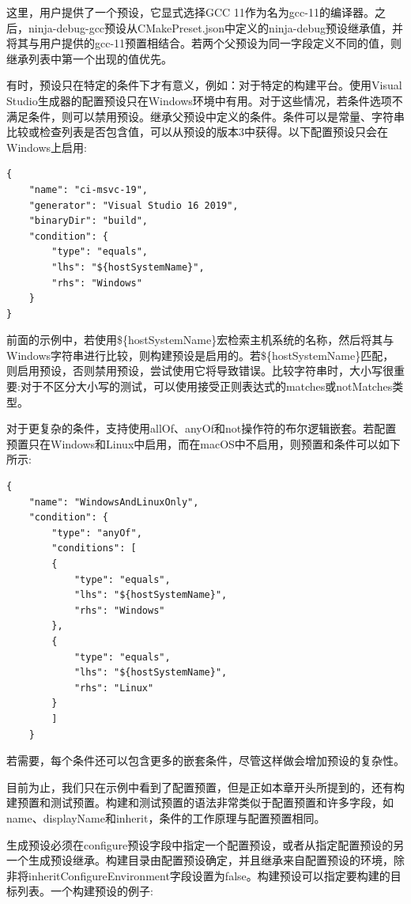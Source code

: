 这里，用户提供了一个预设，它显式选择GCC 11作为名为gcc-11的编译器。之后，ninja-debug-gcc预设从CMakePreset.json中定义的ninja-debug预设继承值，并将其与用户提供的gcc-11预置相结合。若两个父预设为同一字段定义不同的值，则继承列表中第一个出现的值优先。


有时，预设只在特定的条件下才有意义，例如：对于特定的构建平台。使用Visual Studio生成器的配置预设只在Windows环境中有用。对于这些情况，若条件选项不满足条件，则可以禁用预设。继承父预设中定义的条件。条件可以是常量、字符串比较或检查列表是否包含值，可以从预设的版本3中获得。以下配置预设只会在Windows上启用:

\begin{lstlisting}[style=styleCMake]
{
	"name": "ci-msvc-19",
	"generator": "Visual Studio 16 2019",
	"binaryDir": "build",
	"condition": {
		"type": "equals",
		"lhs": "${hostSystemName}",
		"rhs": "Windows"
	}
}
\end{lstlisting}

前面的示例中，若使用\$\{hostSystemName\}宏检索主机系统的名称，然后将其与Windows字符串进行比较，则构建预设是启用的。若\$\{hostSystemName\}匹配，则启用预设，否则禁用预设，尝试使用它将导致错误。比较字符串时，大小写很重要:对于不区分大小写的测试，可以使用接受正则表达式的matches或notMatches类型。

对于更复杂的条件，支持使用allOf、anyOf和not操作符的布尔逻辑嵌套。若配置预置只在Windows和Linux中启用，而在macOS中不启用，则预置和条件可以如下所示:

\begin{lstlisting}[style=styleCMake]
{
	"name": "WindowsAndLinuxOnly",
	"condition": {
		"type": "anyOf",
		"conditions": [
		{
			"type": "equals",
			"lhs": "${hostSystemName}",
			"rhs": "Windows"
		},
		{
			"type": "equals",
			"lhs": "${hostSystemName}",
			"rhs": "Linux"
		}
		]
	}
\end{lstlisting}

若需要，每个条件还可以包含更多的嵌套条件，尽管这样做会增加预设的复杂性。

目前为止，我们只在示例中看到了配置预置，但是正如本章开头所提到的，还有构建预置和测试预置。构建和测试预置的语法非常类似于配置预置和许多字段，如name、displayName和inherit，条件的工作原理与配置预置相同。

生成预设必须在configure预设字段中指定一个配置预设，或者从指定配置预设的另一个生成预设继承。构建目录由配置预设确定，并且继承来自配置预设的环境，除非将inheritConfigureEnvironment字段设置为false。构建预设可以指定要构建的目标列表。一个构建预设的例子:

